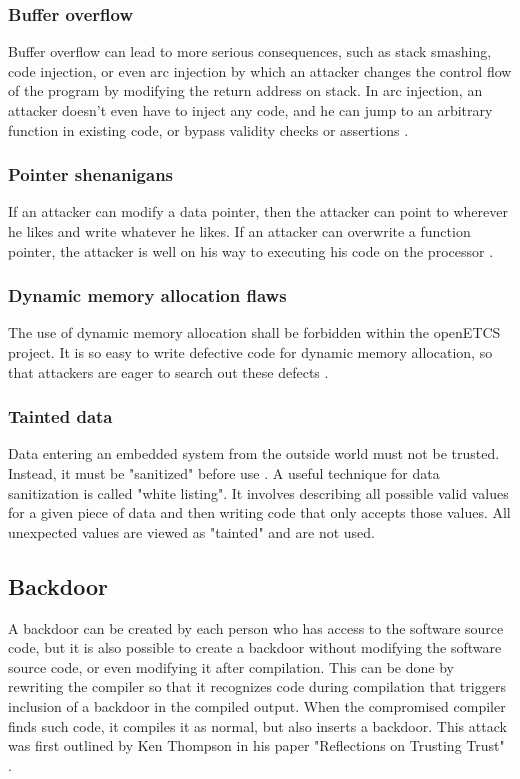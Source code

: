 \documentclass{template/openetcs_report}
\begin{document}
\subsubsection{Buffer overflow}
Buffer overflow can lead to more serious consequences, such as stack smashing, code injection, or even arc injection by which an attacker changes the control flow of the program by modifying the return address on stack. In arc injection, an attacker doesn't even have to inject any code, and he can jump to an arbitrary function in existing code, or bypass validity checks or assertions \cite{Kalinsky09}.

\subsubsection{Pointer shenanigans}
If an attacker can modify a data pointer, then the attacker can point to wherever he likes and write whatever he likes. If an attacker can overwrite a function pointer, the attacker is well on his way to executing his code on the processor \cite{Kalinsky09}.

\subsubsection{Dynamic memory allocation flaws}
The use of dynamic memory allocation shall be forbidden within the openETCS project. It is so easy to write defective code for dynamic memory allocation, so that attackers are eager to search out these defects \cite{Kalinsky09}.

\subsubsection{Tainted data}
Data entering an embedded system from the outside world must not be trusted. Instead, it must be "sanitized" before use \cite{Kalinsky09}.
A useful technique for data sanitization is called "white listing". It involves describing all possible valid values for a given piece of data and then writing code that only accepts those values. All unexpected values are viewed as "tainted" and are not used.


\subsection{Backdoor}
\label{Backdoor}
A backdoor can be created by each person who has access to the software source code, but it is also possible to create a backdoor without modifying the software source code, or even modifying it after compilation. This can be done by rewriting the compiler so that it recognizes code during compilation that triggers inclusion of a backdoor in the compiled output. When the compromised compiler finds such code, it compiles it as normal, but also inserts a backdoor. This attack was first outlined by Ken Thompson in his paper "Reflections on Trusting Trust" \cite{Ken84}.
\end{document}
